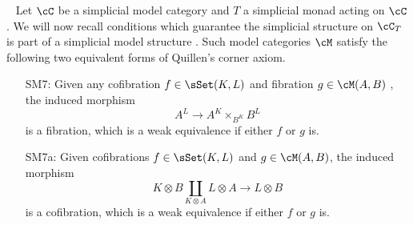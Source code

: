 \documentclass[leqno,oneside,english]{elsarticle}
\newcounter{enumisaved}
\newlength{\thmsaved}
\newlength{\thmnow}
\begin{document}
{{{}
  {}
  \ 
  \ifthenelse{\lengthtest{\thmnow > \thmsaved}}{
    
    \setcounter{thm}{{\strip@pt{\thmsaved}}}  
  }{
    
  }
  \setcounter{enumi}{\theenumisaved}
    \else  \fi
}}{}
Let $\cC$ be a simplicial model category and $T$ a simplicial monad acting on $\cC$.
We will now recall conditions which guarantee the simplicial structure on $\cC_T$ is
part of a simplicial model structure \cite{Qui67}. Such model
categories $\cM$ satisfy the following two equivalent forms of
Quillen's corner axiom.

\begin{itemize}
  \item[SM7:] Given any cofibration $f\in \sSet(K, L)$ and fibration
  $g\in  \cM(A, B)$ , the induced morphism
  \[ A^L\longrightarrow A^K\times_{B^K}B^L \]
  is a fibration, which is a weak equivalence if either $f$ or $g$ is.

  \item[SM7a:] Given cofibrations $f\in \sSet(K, L)$ and 
  $g\in  \cM(A, B)$, the induced morphism
\[K\otimes B\coprod _{K\otimes A} L\otimes A\longrightarrow L\otimes B\]
  is a cofibration, which is a weak equivalence if either $f$ or $g$ is.
\end{itemize}
\end{document}
